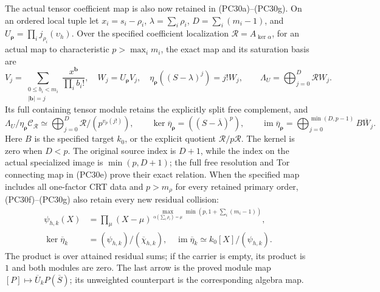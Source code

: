 The actual tensor coefficient map is also now retained in
(PC30a)--(PC30g).  On an ordered local tuple let
\(x_i=s_i-\rho_i\), \(\lambda=\sum_i\rho_i\),
\(D=\sum_i(m_i-1)\), and
\(U_{\boldsymbol\rho}=\prod_i j_{\rho_i}(\upsilon_h)\).
Over the specified coefficient localization
\(\mathscr R=A_{\ker\alpha}\), for an actual map to characteristic
\(p>\max_i m_i\), the exact map and its saturation basis are
\[
 V_j=\sum_{\substack{0\le b_i<m_i\\|\mathbf b|=j}}
            \frac{x^{\mathbf b}}{\prod_i b_i!},\quad
 W_j=U_{\boldsymbol\rho}V_j,\quad
 \eta_{\boldsymbol\rho}((S-\lambda)^j)=j!W_j,
 \qquad
 \Lambda_U=\bigoplus_{j=0}^D\mathscr R W_j.
\]
Its full containing tensor module retains the explicitly split
free complement, and
\[
 \Lambda_U/\eta_{\boldsymbol\rho}\mathcal C_{\mathscr R}
    \simeq\bigoplus_{j=0}^D
                  \mathscr R/(p^{v_p(j!)}),\qquad
 \ker\overline\eta_{\boldsymbol\rho}
      =((S-\overline\lambda)^p),\qquad
 \operatorname{im}\overline\eta_{\boldsymbol\rho}
      =\bigoplus_{j=0}^{\min(D,p-1)}B\overline W_j .
\]
Here \(B\) is the specified target \(k_0\), or the explicit
quotient \(\mathscr R/p\mathscr R\). The kernel is zero when \(D<p\).
The original source index is \(D+1\), while the index on the
actual specialized image is \(\min(p,D+1)\); the full free
resolution and Tor connecting map in (PC30e) prove their exact
relation.  When the specified map includes all one-factor CRT
data and \(p>m_\rho\) for every retained primary order, (PC30f)--(PC30g) also retain every new residual collision:
\[
 \begin{aligned}
 \psi_{h,k}(X)&=
 \prod_{\mu}
 (X-\mu)^{
 \max_{\alpha(\sum_i\rho_i)=\mu}
            \min(p,1+\sum_i(m_i-1))},\\
 \ker\overline\eta_k&=(\psi_{h,k})/(\overline\chi_{h,k}),\quad
 \operatorname{im}\overline\eta_k\simeq k_0[X]/(\psi_{h,k}).
 \end{aligned}
\]
The product is over attained residual sums; if the carrier is empty,
its product is \(1\) and both modules are zero.
The last arrow is the proved module map
\([P]\mapsto\overline U_kP(\overline S)\); its unweighted
counterpart is the corresponding algebra map.


